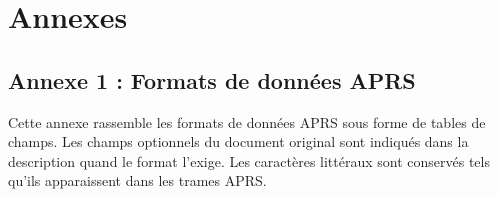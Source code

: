 \chapter*{Annexes}\label{annexes}
\newcommand{\AnnexeTableHeader}[1]{\centering\arraybackslash\textbf{#1}}

\clearpage
\section*{Annexe 1 : Formats de données APRS}\label{annexe-1-formats-de-donnuxe9es-aprs}

{\small
Cette annexe rassemble les formats de données APRS sous forme de tables
de champs. Les champs optionnels du document original sont indiqués dans
la description quand le format l'exige. Les caractères littéraux sont
conservés tels qu'ils apparaissent dans les trames APRS.
}

